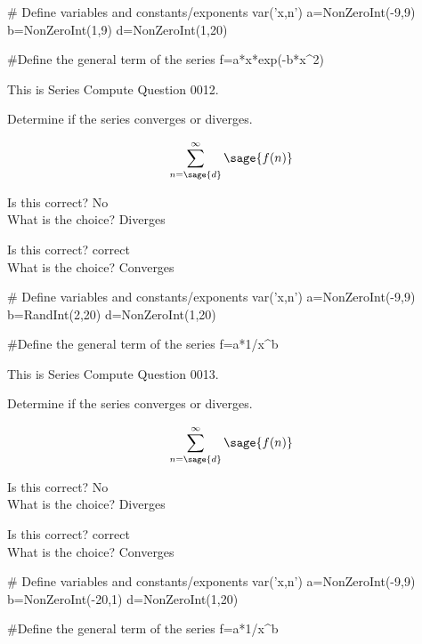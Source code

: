 \documentclass{ximera}
\renewcommand{\latexProblemContent}[1]{#1}
\renewcommand{\choice}[2][No]{\item Is this correct? #1 \\ What is the choice? #2}
\begin{document}
\begin{sagesilent}
# Define variables and constants/exponents
var('x,n')
a=NonZeroInt(-9,9)
b=NonZeroInt(1,9)
d=NonZeroInt(1,20)

#Define the general term of the series
f=a*x*exp(-b*x^2)

\end{sagesilent}

\latexProblemContent{
\ifVerboseLocation This is Series Compute Question 0012. \\ \fi
\begin{problem}
Determine if the series converges or diverges.  

\[\sum_{n=\sage{d}}^\infty \sage{f(n)}\]



\begin{multipleChoice}
\choice{Diverges}
\choice[correct]{Converges}
\end{multipleChoice}

\end{problem}}%


\begin{sagesilent}
# Define variables and constants/exponents
var('x,n')
a=NonZeroInt(-9,9)
b=RandInt(2,20)
d=NonZeroInt(1,20)

#Define the general term of the series
f=a*1/x^b

\end{sagesilent}

\latexProblemContent{
\ifVerboseLocation This is Series Compute Question 0013. \\ \fi
\begin{problem}
Determine if the series converges or diverges.  

\[\sum_{n=\sage{d}}^\infty \sage{f(n)}\]



\begin{multipleChoice}
\choice{Diverges}
\choice[correct]{Converges}
\end{multipleChoice}

\end{problem}}%

\begin{sagesilent}
# Define variables and constants/exponents
var('x,n')
a=NonZeroInt(-9,9)
b=NonZeroInt(-20,1)
d=NonZeroInt(1,20)

#Define the general term of the series
f=a*1/x^b

\end{sagesilent}
\end{document}
